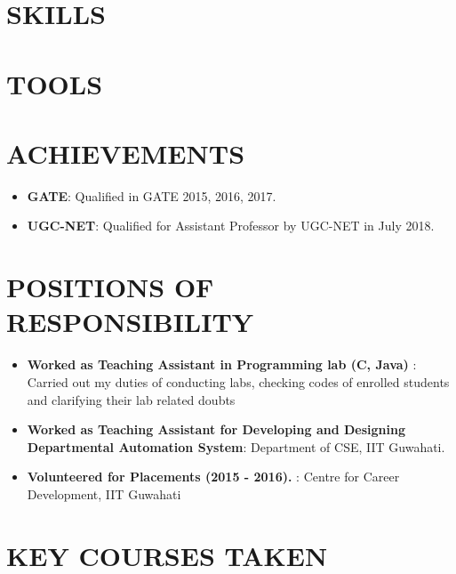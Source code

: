 \documentclass[letterpaper,11pt]{article}
\newcommand{\resumeItem}[2]{
  \item\small{
    \textbf{#1}{: #2 \vspace{-2pt}}
  }
}
\newcommand{\resumeSubHeadingListStart}{\begin{itemize}[leftmargin=*]}
\newcommand{\resumeSubHeadingListEnd}{\end{itemize}}
\begin{document}
\section{SKILLS}
  \resumeSubHeadingListStart
  \resumeSubHeadingListEnd
\section{TOOLS}
  \resumeSubHeadingListStart
  \resumeSubHeadingListEnd
\section{ACHIEVEMENTS}
  \resumeSubHeadingListStart
    \resumeItem{GATE}{Qualified in GATE 2015, 2016, 2017.}
\resumeItem{UGC-NET}{Qualified for Assistant Professor by UGC-NET in July 2018.}
  \resumeSubHeadingListEnd
\section{POSITIONS OF RESPONSIBILITY}
  \resumeSubHeadingListStart
    \resumeItem{Worked as Teaching Assistant in Programming lab (C, Java) }{Carried out my duties of conducting labs, checking codes of enrolled students and clarifying their lab related doubts}
    \resumeItem{Worked as Teaching Assistant for Developing and Designing Departmental Automation System}{Department of CSE, IIT Guwahati.}
    \resumeItem{Volunteered for Placements (2015 - 2016).
}{Centre for Career Development, IIT Guwahati}
  \resumeSubHeadingListEnd
\section{KEY COURSES TAKEN}
  \resumeSubHeadingListStart
{}

  \resumeSubHeadingListEnd


\end{document}
